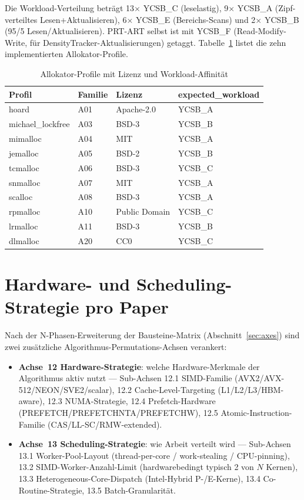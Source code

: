 Die Workload-Verteilung beträgt 13$\times$ YCSB\_C (leselastig), 9$\times$ YCSB\_A
(Zipf-verteiltes Lesen+Aktualisieren), 6$\times$ YCSB\_E (Bereichs-Scans) und 2$\times$
YCSB\_B (95/5 Lesen/Aktualisieren). PRT-ART selbst ist mit YCSB\_F (Read-Modify-Write, für
DensityTracker-Aktualisierungen) getaggt. Tabelle~\ref{tab:allocator-profiles} listet die
zehn implementierten Allokator-Profile.

\begin{table}[!htbp]
\caption{Allokator-Profile mit Lizenz und Workload-Affinität}\label{tab:allocator-profiles}
\centering\small
\begin{tabular}{llll}
\toprule
\textbf{Profil} & \textbf{Familie} & \textbf{Lizenz} & \textbf{expected\_workload} \\
\midrule
hoard & A01 & Apache-2.0 & YCSB\_A \\
michael\_lockfree & A03 & BSD-3 & YCSB\_B \\
mimalloc & A04 & MIT & YCSB\_A \\
jemalloc & A05 & BSD-2 & YCSB\_B \\
tcmalloc & A06 & BSD-3 & YCSB\_C \\
snmalloc & A07 & MIT & YCSB\_A \\
scalloc & A08 & BSD-3 & YCSB\_A \\
rpmalloc & A10 & Public Domain & YCSB\_C \\
lrmalloc & A11 & BSD-3 & YCSB\_B \\
dlmalloc & A20 & CC0 & YCSB\_C \\
\bottomrule
\end{tabular}
\end{table}

\section{Hardware- und Scheduling-Strategie pro Paper}\label{sec:hw-sched}

Nach der N-Phasen-Erweiterung der Bausteine-Matrix (Abschnitt~\ref{sec:axes}) sind zwei
zusätzliche Algorithmus-Permutations-Achsen verankert:

\begin{itemize}
  \item \textbf{Achse~12 Hardware-Strategie}: welche Hardware-Merkmale der Algorithmus aktiv
        nutzt --- Sub-Achsen 12.1 SIMD-Familie (AVX2/AVX-512/NEON/SVE2/scalar), 12.2
        Cache-Level-Targeting (L1/L2/L3/HBM-aware), 12.3 NUMA-Strategie, 12.4
        Prefetch-Hardware (PREFETCH/PREFETCHNTA/PREFETCHW), 12.5 Atomic-Instruction-Familie
        (CAS/LL-SC/RMW-extended).
  \item \textbf{Achse~13 Scheduling-Strategie}: wie Arbeit verteilt wird --- Sub-Achsen 13.1
        Worker-Pool-Layout (thread-per-core / work-stealing / CPU-pinning), 13.2
        SIMD-Worker-Anzahl-Limit (hardwarebedingt typisch 2 von $N$ Kernen), 13.3
        Heterogeneous-Core-Dispatch (Intel-Hybrid P-/E-Kerne), 13.4 Co-Routine-Strategie,
        13.5 Batch-Granularität.
\end{itemize}

